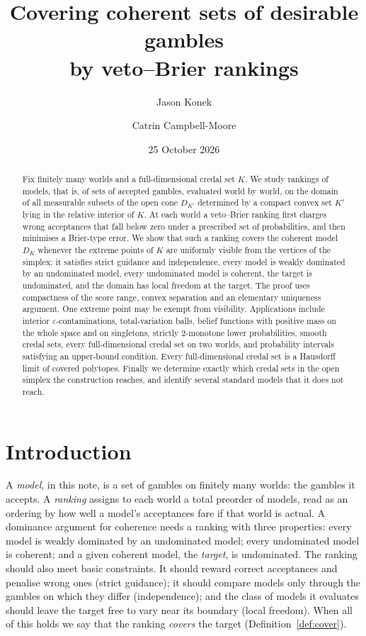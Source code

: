 \documentclass[11pt]{article}
\title{Covering coherent sets of desirable gambles\\ by veto--Brier rankings}
\author{Jason Konek \and Catrin Campbell-Moore}
\date{25 October 2026}
\theoremstyle{plain}
\theoremstyle{definition}
\theoremstyle{remark}
\begin{document}
\maketitle

\begin{abstract}
Fix finitely many worlds and a full-dimensional credal set $K$. We study rankings of
models, that is, of sets of accepted gambles, evaluated world by world, on the domain of
all measurable subsets of the open cone $D_{K'}$ determined by a compact convex set $K'$
lying in the relative interior of $K$. At each world a veto--Brier ranking first charges
wrong acceptances that fall below zero under a prescribed set of probabilities, and then
minimises a Brier-type error. We show that such a ranking covers the coherent model
$D_K$ whenever the extreme points of $K$ are uniformly visible from the vertices of the
simplex: it satisfies strict guidance and independence, every model is weakly dominated
by an undominated model, every undominated model is coherent, the target is undominated,
and the domain has local freedom at the target. The proof uses compactness of the score
range, convex separation and an elementary uniqueness argument. One extreme point may be
exempt from visibility. Applications include interior $\varepsilon$-contaminations,
total-variation balls, belief functions with positive mass on the whole space and on
singletons, strictly $2$-monotone lower probabilities, smooth credal sets, every
full-dimensional credal set on two worlds, and probability intervals satisfying an
upper-bound condition. Every full-dimensional credal set is a Hausdorff limit of covered
polytopes. Finally we determine exactly which credal sets in the open simplex the
construction reaches, and identify several standard models that it does not reach.
\end{abstract}

\tableofcontents

\section{Introduction}\label{sec:intro}

A \emph{model}, in this note, is a set of gambles on finitely many worlds: the gambles it
accepts. A \emph{ranking} assigns to each world a total preorder of models, read as an
ordering by how well a model's acceptances fare if that world is actual. A dominance
argument for coherence needs a ranking with three properties: every model is weakly
dominated by an undominated model; every undominated model is coherent; and a given
coherent model, the \emph{target}, is undominated. The ranking should also meet basic
constraints. It should reward correct acceptances and penalise wrong ones (strict
guidance); it should compare models only through the gambles on which they differ
(independence); and the class of models it evaluates should leave the target free to vary
near its boundary (local freedom). When all of this holds we say that the ranking
\emph{covers} the target (Definition~\ref{def:cover}).
\end{document}
